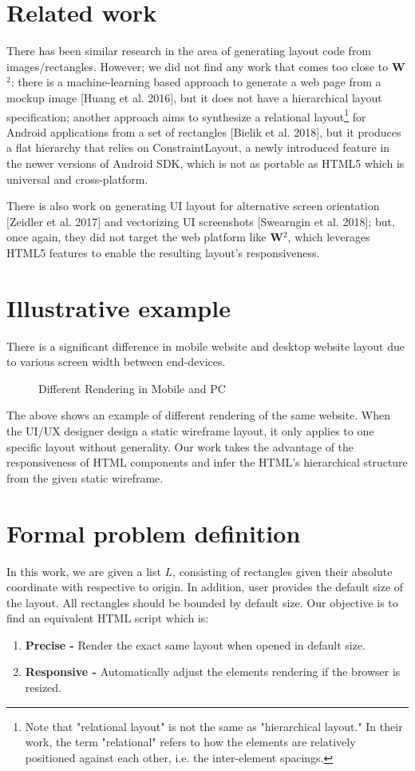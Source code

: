 \documentclass[runningheads]{llncs}
\begin{document}
\section{Related work}
There has been similar research in the area of generating layout code from images/rectangles. However; we did not find any work that comes too close to \textbf{W}$^2$: there is a machine-learning based approach to generate a web page from a mockup image [Huang et al. 2016], but it does not have a hierarchical layout specification; another approach aims to synthesize a relational layout\protect\footnote{ Note that "relational layout" is not the same as "hierarchical layout." In their work, the term "relational" refers to how the elements are relatively positioned against each other, i.e. the inter-element spacings.} for Android applications from a set of rectangles [Bielik et al. 2018], but it produces a flat hierarchy that relies on ConstraintLayout, a newly introduced feature in the newer versions of Android SDK, which is not as portable as HTML5 which is universal and cross-platform.

There is also work on generating UI layout for alternative screen orientation [Zeidler et al. 2017] and vectorizing UI screenshots [Swearngin et al. 2018]; but, once again, they did not target the web platform like \textbf{W}$^2$, which leverages HTML5 features to enable the resulting layout's responsiveness.


\section{Illustrative example}
There is a significant difference in mobile website and desktop website layout due to various screen width between end-devices. 
\begin{figure}[H]
  \vspace*{-0.1in}
  \caption{Different Rendering in Mobile and PC}
\end{figure}
The above shows an example of different rendering of the same website. When the UI/UX designer design a static wireframe layout, it only applies to one specific layout without generality. Our work takes the advantage of the responsiveness of HTML components and infer the HTML's hierarchical structure from the given static wireframe. 

\section{Formal problem definition}
In this work, we are given a list $L$, consisting of rectangles given their absolute coordinate with respective to origin. In addition, user provides the default size of the layout. All rectangles should be bounded by default size. Our objective is to find an equivalent HTML script which is: 
\begin{enumerate}
  \item \textbf{Precise -} Render the exact same layout when opened in  default size.
  \item \textbf{Responsive -} Automatically adjust the elements rendering if the browser is resized.
\end{enumerate}
\end{document}
